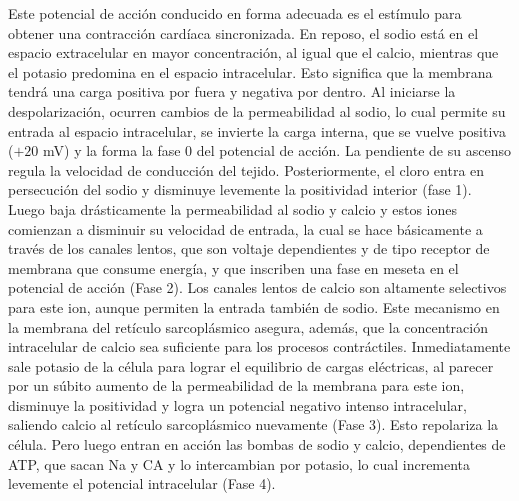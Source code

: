 \documentclass[spanish,11pt,letterpaper,oneside]{memoir}
\begin{document}
	Este potencial de acción conducido en forma adecuada es el estímulo para obtener una contracción cardíaca sincronizada. En reposo, el sodio está en el espacio extracelular en mayor concentración, al igual que el calcio, mientras que el potasio predomina en el espacio intracelular. Esto significa que la membrana tendrá una carga positiva por fuera y negativa por dentro. Al iniciarse la despolarización, ocurren cambios de la permeabilidad al sodio, lo cual permite su entrada al espacio intracelular, se invierte la carga interna, que se vuelve positiva ($+20$ mV) y la forma la fase 0 del potencial de acción. La pendiente de su ascenso regula la velocidad de conducción del tejido. Posteriormente, el cloro entra en persecución del sodio y disminuye levemente la positividad interior (fase 1). Luego baja drásticamente la permeabilidad al sodio y calcio y estos iones comienzan a disminuir su velocidad de entrada, la cual se hace básicamente a través de los canales lentos, que son voltaje dependientes y de tipo receptor de membrana que consume energía, y que inscriben una fase en meseta en el potencial de acción (Fase 2). Los canales lentos de calcio son altamente selectivos para este ion, aunque permiten la entrada también de sodio. Este mecanismo en la membrana del retículo sarcoplásmico asegura, además, que la concentración intracelular de calcio sea suficiente para los procesos contráctiles. Inmediatamente sale potasio de la célula para lograr el equilibrio de cargas eléctricas, al parecer por un súbito aumento de la permeabilidad de la membrana para este ion, disminuye la positividad y logra un potencial negativo intenso intracelular, saliendo calcio al retículo sarcoplásmico nuevamente (Fase 3). Esto repolariza la célula. Pero luego entran en acción las bombas de sodio y calcio, dependientes de ATP, que sacan Na y CA y lo intercambian por potasio, lo cual incrementa levemente el potencial intracelular (Fase 4).
	
\end{document}
